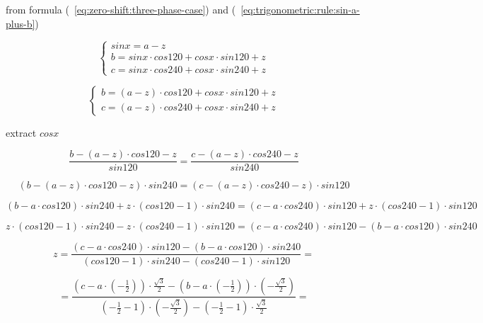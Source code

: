 \documentclass[unicode, 12pt, a4paper]{article}
\begin{document}
from formula (~\ref{eq:zero-shift:three-phase-case}) and (~\ref{eq:trigonometric:rule:sin-a-plus-b})

\begin{equation}
  \begin{cases}
    sin x = a - z\\
    b = sin x \cdot cos 120 + cos x \cdot sin 120 + z\\
    c = sin x \cdot cos 240 + cos x \cdot sin 240 + z
  \end{cases}
\end{equation}

\begin{equation}
  \begin{cases}
    b = (a - z) \cdot cos 120 + cos x \cdot sin 120 + z\\
    c = (a - z) \cdot cos 240 + cos x \cdot sin 240 + z
  \end{cases}
\end{equation}

extract $cos x$

\begin{equation}
  \frac{b - (a - z) \cdot cos 120 - z}{sin 120} = \frac{c - (a - z) \cdot cos 240 - z}{sin 240}
\end{equation}


\begin{equation}
  (b - (a - z) \cdot cos 120 - z) \cdot sin 240 = (c - (a - z) \cdot cos 240 - z) \cdot sin 120
\end{equation}

\begin{equation}
  (b - a \cdot cos 120) \cdot sin 240 + z \cdot (cos 120 - 1) \cdot sin 240 = (c - a \cdot cos 240) \cdot sin 120 + z \cdot (cos 240 - 1) \cdot sin 120
\end{equation}


\begin{equation}
  z \cdot (cos 120 - 1) \cdot sin 240  - z \cdot (cos 240 - 1) \cdot sin 120 = (c - a \cdot cos 240) \cdot sin 120 - (b - a \cdot cos 120) \cdot sin 240
\end{equation}


\begin{equation}
  z = \frac{(c - a \cdot cos 240) \cdot sin 120 - (b - a \cdot cos 120) \cdot sin 240}{(cos 120 - 1) \cdot sin 240  - (cos 240 - 1) \cdot sin 120} =
\end{equation}

\begin{equation}
  = \frac{(c - a \cdot (-\frac{1}{2})) \cdot \frac{\sqrt{3}}{2} - (b - a \cdot (-\frac{1}{2})) \cdot (-\frac{\sqrt{3}}{2})}{(-\frac{1}{2} - 1) \cdot (-\frac{\sqrt{3}}{2})  - (-\frac{1}{2} - 1) \cdot \frac{\sqrt{3}}{2}} =
\end{equation}
\end{document}
